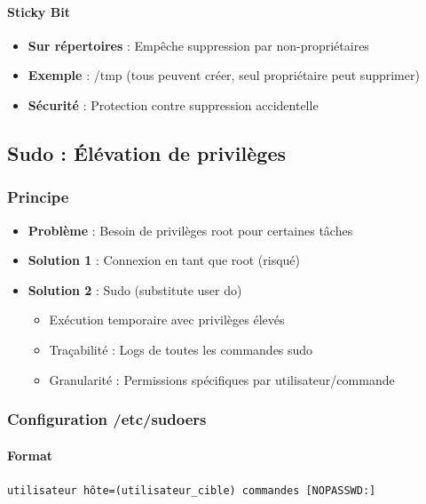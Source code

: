 \documentclass[12pt,a4paper]{article}
\begin{document}
\paragraph{Sticky Bit}
\begin{itemize}
    \item \textbf{Sur répertoires} : Empêche suppression par non-propriétaires
    \item \textbf{Exemple} : /tmp (tous peuvent créer, seul propriétaire peut supprimer)
    \item \textbf{Sécurité} : Protection contre suppression accidentelle
\end{itemize}

\subsection{Sudo : Élévation de privilèges}

\subsubsection{Principe}

\begin{itemize}
    \item \textbf{Problème} : Besoin de privilèges root pour certaines tâches
    \item \textbf{Solution 1} : Connexion en tant que root (risqué)
    \item \textbf{Solution 2} : Sudo (substitute user do)
    \begin{itemize}
        \item Exécution temporaire avec privilèges élevés
        \item Traçabilité : Logs de toutes les commandes sudo
        \item Granularité : Permissions spécifiques par utilisateur/commande
    \end{itemize}
\end{itemize}

\subsubsection{Configuration /etc/sudoers}

\paragraph{Format}
\texttt{utilisateur hôte=(utilisateur\_cible) commandes [NOPASSWD:]}
\end{document}
